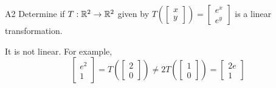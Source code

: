 \documentclass{sbgLAquiz}
\begin{document}
\begin{extract}\newpage\end{extract}
\begin{problem}{A2} 
 Determine if $T: \mathbb{R}^2 \rightarrow \mathbb{R}^2$ given by $T\left(\begin{bmatrix} x \\ y \end{bmatrix}\right) = \begin{bmatrix} e^{x} \\ e^y \end{bmatrix}$ is a linear transformation.
\end{problem}
\begin{solution}
It is not linear.  For example, $$\begin{bmatrix}e^2 \\ 1 \end{bmatrix} = T\left(\begin{bmatrix} 2 \\ 0 \end{bmatrix} \right) \neq 2 T\left(\begin{bmatrix} 1 \\ 0 \end{bmatrix}\right)=\begin{bmatrix} 2e \\ 1 \end{bmatrix}$$
\end{solution}
\end{document}
